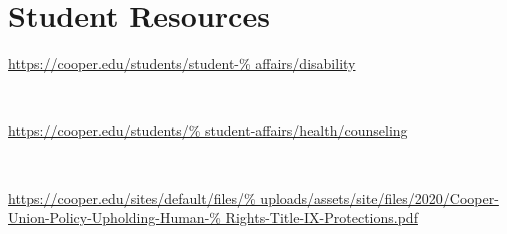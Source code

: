 \documentclass{article}
\begin{document}
\section{Student Resources}

 \url{https://cooper.edu/students/student-%
affairs/disability}

\

\noindent
{} \url{https://cooper.edu/students/%
student-affairs/health/counseling}

\

\noindent
{} \url{https://cooper.edu/sites/default/files/%
uploads/assets/site/files/2020/Cooper-Union-Policy-Upholding-Human-%
Rights-Title-IX-Protections.pdf}
\end{document}
